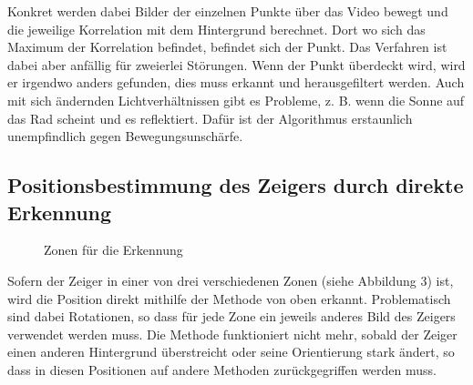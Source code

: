 \documentclass[a4paper,german,12pt,smallheadings]{scrartcl}
\begin{document}
Konkret werden dabei Bilder der einzelnen Punkte über das Video bewegt und die
jeweilige Korrelation mit dem Hintergrund berechnet. Dort wo sich das Maximum
der Korrelation befindet, befindet sich der Punkt. Das Verfahren ist dabei aber
anfällig für zweierlei Störungen. Wenn der Punkt überdeckt wird, wird er
irgendwo anders gefunden, dies muss erkannt und herausgefiltert werden. Auch
mit sich ändernden Lichtverhältnissen gibt es Probleme, z. B. wenn die Sonne auf
das Rad scheint und es reflektiert. Dafür ist der Algorithmus erstaunlich
unempfindlich gegen Bewegungsunschärfe.

\subsection{Positionsbestimmung des Zeigers durch direkte Erkennung}
\begin{figure}
  \label{zones}
  \caption{Zonen für die Erkennung}
\end{figure}
Sofern der Zeiger in einer von drei verschiedenen Zonen (siehe Abbildung 3) ist,
wird die Position direkt mithilfe der Methode von oben erkannt. Problematisch
sind dabei Rotationen, so dass für jede Zone ein jeweils anderes Bild des
Zeigers verwendet werden muss. Die Methode funktioniert nicht mehr, sobald der
Zeiger einen anderen Hintergrund überstreicht oder seine Orientierung stark
ändert, so dass in diesen Positionen auf andere Methoden zurückgegriffen werden
muss.
\end{document}
